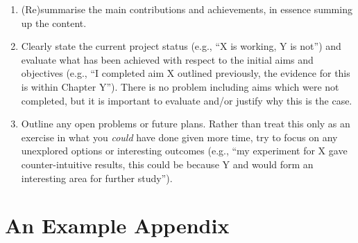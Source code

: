 \documentclass[ %
                    author={Luke Murray},
                supervisor={Dr. Simon Hollis},
                     title={Shadow Peer-to-Peer Networks},
                  subtitle={},
                    degree={MEng},
                      year={2013} ]{thesis}
\begin{document}
\begin{enumerate}
\item (Re)summarise the main contributions and achievements, in essence
      summing up the content.
\item Clearly state the current project status (e.g., ``X is working, Y 
      is not'') and evaluate what has been achieved with respect to the 
      initial aims and objectives (e.g., ``I completed aim X outlined 
      previously, the evidence for this is within Chapter Y'').  There 
      is no problem including aims which were not completed, but it is 
      important to evaluate and/or justify why this is the case.
\item Outline any open problems or future plans.  Rather than treat this
      only as an exercise in what you {\em could} have done given more 
      time, try to focus on any unexplored options or interesting outcomes
      (e.g., ``my experiment for X gave counter-intuitive results, this 
      could be because Y and would form an interesting area for further 
      study'').
\end{enumerate}


%
%

\backmatter





\appendix

\chapter{An Example Appendix}
\label{appx:example}
\end{document}
